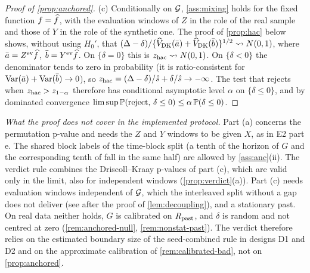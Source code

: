 \begin{proof}[Proof of \cref{prop:anchored}]
(c) Conditionally on $\mathcal{G}$, \cref{ass:mixing} holds for the fixed function $f=\widehat{f}$, with the
evaluation windows of $Z$ in the role of the real sample and those of $Y$ in the role of the
synthetic one. The proof of \cref{prop:hac} below shows, without using $H_0'$, that
$(\Delta-\delta)/\{\widehat V_{\mathrm{DK}}(\bar a)+\widehat V_{\mathrm{DK}}(\bar b)\}^{1/2}\rightsquigarrow N(0,1)$, where
$\bar a=Z^{\mathrm{ev}}\widehat{f}$, $\bar b=Y^{\mathrm{ev}}\widehat{f}$. On $\{\delta=0\}$ this is $z_{\mathrm{hac}}\rightsquigarrow N(0,1)$. On
$\{\delta<0\}$ the denominator tends to zero in probability (it is ratio-consistent for
$\operatorname{Var}(\bar a)+\operatorname{Var}(\bar b)\to0$), so $z_{\mathrm{hac}}=(\Delta-\delta)/\hat s+\delta/\hat s\to-\infty$. The
test that rejects when $z_{\mathrm{hac}}>z_{1-\alpha}$ therefore has conditional asymptotic level $\alpha$ on
$\{\delta\le0\}$, and by dominated convergence
$\limsup\mathbb{P}(\text{reject},\,\delta\le0)\le\alpha\,\mathbb{P}(\delta\le0)$.
\end{proof}

\emph{What the proof does not cover in the implemented protocol.} Part (a) concerns the
permutation p-value and needs the $Z$ and $Y$ windows to be \iid{} given $X$, as in E2 part e.
The shared block labels of the time-block split (a tenth of the \TEST{} horizon of $G$ and the
corresponding tenth of \TRAIN{} fall in the same half) are allowed by \cref{ass:anc}(ii). The
verdict rule combines the Driscoll--Kraay p-values of part (c), which are valid only in the limit,
also for independent windows (\cref{prop:verdict}(a)). Part (c) needs evaluation windows
independent of $\mathcal{G}$, which the interleaved split without a gap does not deliver (see after the
proof of \cref{lem:decoupling}), and a stationary past. On real data neither holds, $G$ is
calibrated on $R_{\mathrm{past}}$, and $\delta$ is random and not centred at zero (\cref{rem:anchored-null},
\cref{rem:nonstat-past}). The verdict therefore relies on the estimated boundary size of the
seed-combined rule in designs D1 and D2 and on the approximate calibration of
\cref{rem:calibrated-bad}, not on \cref{prop:anchored}.

